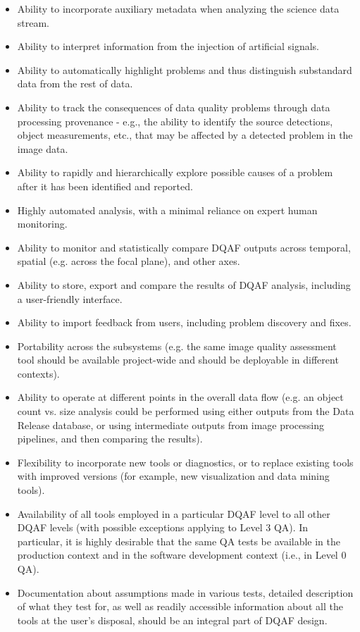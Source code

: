 \documentclass[SE,toc]{lsstdoc}
\begin{document}
\begin{itemize}
\item Ability to incorporate auxiliary metadata when analyzing the science data stream.
\item Ability to interpret information from the injection of artificial signals.
\item Ability to automatically highlight problems and thus distinguish substandard data from the rest of data.
\item Ability to track the consequences of data quality problems through data processing provenance - e.g., the ability to identify the source detections, object measurements, etc., that may be affected by a detected problem in the image data.
\item Ability to rapidly and hierarchically explore possible causes of a problem after it has been identified and reported.
\item Highly automated analysis, with a minimal reliance on expert human monitoring.
\item Ability to monitor and statistically compare DQAF outputs across temporal, spatial (e.g. across the focal plane), and other axes.
\item Ability to store, export and compare the results of DQAF analysis, including a user-friendly interface.
\item Ability to import feedback from users, including problem discovery and fixes.
\item Portability across the subsystems (e.g. the same image quality assessment tool should be available
     project-wide and should be deployable in different contexts).
\item Ability to operate at different points in the overall data flow (e.g. an object count vs. size
         analysis could be performed using either outputs from the Data Release database, or
        using intermediate outputs from image processing pipelines, and then comparing the results).
\item Flexibility to incorporate new tools or diagnostics, or to replace existing tools with improved versions
        (for example, new visualization and data mining tools).
\item Availability of all tools employed in a particular DQAF level to all other DQAF levels (with
          possible exceptions applying to Level 3 QA). In particular, it is highly desirable that the same QA tests be available in the production context and in the software development context (i.e., in Level 0 QA).
\item Documentation about assumptions made in various tests, detailed description of what they test
         for, as well as readily accessible information about all the tools at the user's disposal, should
        be an integral part of DQAF design.
\end{itemize}
\end{document}
